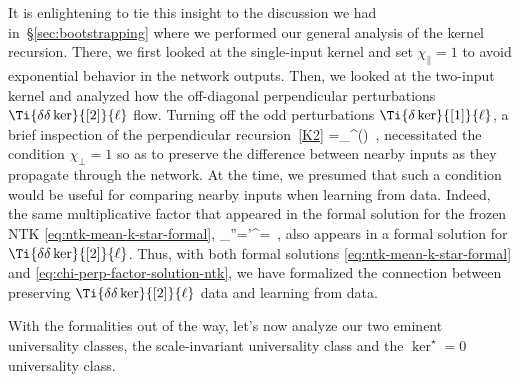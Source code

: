 It is enlightening to tie this insight to the discussion we had in~\S\ref{sec:bootstrapping} where we performed our general  analysis of the kernel recursion. There, we first looked at the single-input kernel and set $\chi_{\parallel}=1$ to avoid exponential behavior in the network outputs. Then, we looked at the two-input kernel and analyzed how the off-diagonal perpendicular perturbations $\Ti{\delta\delta\ker}{[2]}{\ell}$ flow. Turning off the odd perturbations $\Ti{\delta\ker}{[1]}{\ell}$, a brief inspection of the perpendicular recursion~\eqref{K2}
\be\label{eq:ddK-reprint-ntk-eft}
=\chi_{\perp}^{(\ell)}\Ti{\delta\delta \ker}{[2]}{\ell}\, ,
\ee
necessitated the  condition $\chi_{\perp}=1$ so as to preserve the difference between nearby inputs as they propagate through the network. 
At the time, we presumed that such a condition would be useful for comparing nearby inputs when learning from data.
Indeed, the same multiplicative factor that appeared in the formal solution for the frozen NTK \eqref{eq:ntk-mean-k-star-formal},
\be\label{eq:chi-perp-factor-solution-ntk}
\prod_{\ell''=\ell'}^{}=\, ,
\ee
also appears in a formal solution for $\Ti{\delta\delta \ker}{[2]}{\ell}$. Thus, with both formal solutions \eqref{eq:ntk-mean-k-star-formal} and \eqref{eq:chi-perp-factor-solution-ntk}, we have formalized the connection between preserving $\Ti{\delta\delta \ker}{[2]}{\ell}$ data and
learning from data. %

With the formalities out of the way, let's now analyze our two eminent universality classes, the scale-invariant universality class and the $\ker^\star=0$ universality class.


